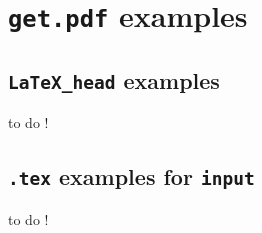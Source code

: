 \section{\texttt{get.pdf} examples}
\label{getpdf_examples}

\subsection{\texttt{LaTeX\_head} examples}

to do !

\subsection{\texttt{.tex} examples for \texttt{input}}

to do !



